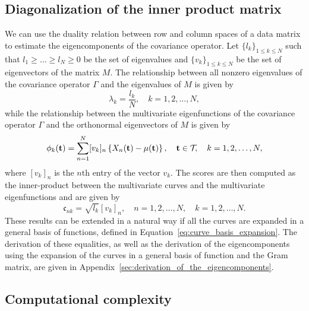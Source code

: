 
\subsection{Diagonalization of the inner product matrix} %
\label{sub:by_diagonalization_of_the_inner_product_matrix}

We can use the duality relation between row and column spaces of a data matrix to estimate the eigencomponents of the covariance operator. 
Let $\{l_k\}_{1 \leq k \leq N}$ such that $l_1 \geq \dots \geq l_N \geq 0$ be the set of eigenvalues and $\{v_k\}_{1 \leq k \leq N}$ be the set of eigenvectors of the matrix $M$. The relationship between all nonzero eigenvalues of the covariance operator $\Gamma$ and the eigenvalues of $M$ is given by
\begin{equation}\label{eq:eigenvalues_relation_p}
    \lambda_k = \frac{l_k}{N}, \quad k = 1, 2, \dots, N,
\end{equation}
while the relationship between the multivariate eigenfunctions of the covariance operator $\Gamma$ and the orthonormal eigenvectors of $M$ is given by
\begin{equation}\label{eq:eigenfunction_relation_p}
    \phi_k(\mathbf{t}) = \sum_{n = 1}^N [v_{k}]_n\left\{X_n(\mathbf{t}) - \mu(\mathbf{t})\right\}, \quad \mathbf{t} \in \mathcal{T}_{}, \quad k = 1, 2, \dots, N, 
\end{equation}
where $[v_{k}]_n$ is the $n$th entry of the vector $v_k$. The scores are then computed as the inner-product between the multivariate curves and the multivariate eigenfunctions and are given by
\begin{equation}\label{eq:scores_relation_p}
    \mathfrak{c}_{nk} = \sqrt{l_k}[v_{k}]_n, \quad n = 1, 2, \dots, N, \quad k = 1, 2, \dots, N. 
\end{equation}
These results can be extended in a natural way if all the curves are expanded in a general basis of functions, defined in Equation~\eqref{eq:curve_basis_expansion}.
The derivation of these equalities, as well as the derivation of the eigencomponents using the expansion of the curves in a general basis of function and the Gram matrix, are given in Appendix~\ref{sec:derivation_of_the_eigencomponents}.


\subsection{Computational complexity} %
\label{sub:computational_complexity}

